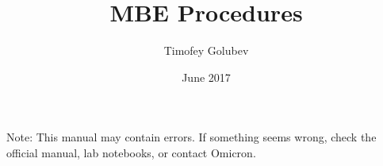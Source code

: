 \documentclass[12pt]{book}
\begin{document}
\title{\huge MBE Procedures}


\author{Timofey Golubev}
\date{June 2017}

\frontmatter
\maketitle 
Note: This manual may contain errors. If something seems wrong, check the official manual, lab notebooks, or contact Omicron.
\tableofcontents

\mainmatter






\end{document}
